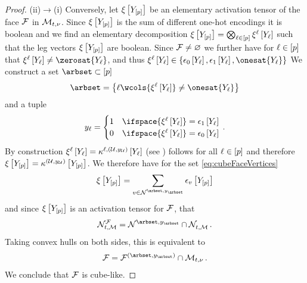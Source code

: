\begin{proof}
    (ii)$\rightarrow$(i)
    Conversely, let $\xi\left[Y_{[p]}\right]$ be an elementary activation tensor of the face $\mathcal{F}$ in $\mathcal{M}_{t,\nu}$.
    Since $\xi\left[Y_{[p]}\right]$ is the sum of different one-hot encodings it is boolean and we find an elementary decomposition $\xi\left[Y_{[p]}\right]=\bigotimes_{\ell\in[p]}\xi^{\ell}\left[Y_{\ell}\right]$ such that the leg vectors $\xi\left[Y_{[p]}\right]$ are boolean.
    Since $\mathcal{F}\neq\varnothing$ we further have for $\ell\in[p]$ that $\acttensorlegwith\neq\zerosat{\headvariableof{\selindex}}$, and thus $\acttensorlegwith\in \{\fbasisat{\headvariableof{\selindex}},\tbasisat{\headvariableof{\selindex}},\onesat{\headvariableof{\selindex}}\}$
    We construct a set $\arbset\subset[\seldim]$
    \begin{align*}
        \arbset
        = \left\{\selindex \wcols {\acttensorlegwith}\neq\onesat{\headvariableof{\selindex}}\right\}
    \end{align*}
    and a tuple
    \begin{align*}
        \headindexof{\selindex}
        = \begin{cases}
              1 & \ifspace {\acttensorlegwith}=\onehotmapofat{1}{\headvariableof{\selindex}} \\
              0 & \ifspace {\acttensorlegwith}=\onehotmapofat{0}{\headvariableof{\selindex}}
        \end{cases} \, .
    \end{align*}
    By construction ${\xi^{\ell}\left[Y_{\ell}\right]} = \kappa^{\ell,(\mathcal{U},y_{\mathcal{U}})}\left[Y_{\ell}\right]$ (see ) follows for all $\ell\in[p]$ and therefore $\xi\left[Y_{[p]}\right]=\kappa^{(\mathcal{U},y_{\mathcal{U}})}\left[Y_{[p]}\right]$.
    We therefore have for the set \eqref{eq:cubeFaceVertices}
    \begin{align*}
        \acttensorwith
        = \sum_{\imelement\in\imsetof{}{\arbset,\headindexof{\arbset}}} \onehotmapofat{\imelement}{\headvariables}
    \end{align*}
    and since $\xi\left[Y_{[p]}\right]$ is an activation tensor for $\mathcal{F}$, that
    \begin{align*}
        \imsetof{\hlnstat,\meanset}{\facesymbol}
        = \imsetof{}{\arbset,\headindexof{\arbset}}\cap\imsetof{\hlnstat,\meanset}{} \, .
    \end{align*}
    Taking convex hulls on both sides, this is equivalent to
    \begin{align*}
        \facesymbol
        = \facesymbolof{(\arbset,\headindexof{\arbset})} \cap \genmeanset \, .
    \end{align*}
    We conclude that $\mathcal{F}$ is cube-like.
\end{proof}

